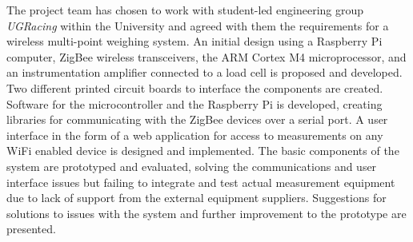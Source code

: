 The project team has chosen to work with student-led engineering group \emph{UGRacing} within the University and agreed with them the requirements for a wireless multi-point weighing system. An initial design using a Raspberry Pi computer, ZigBee wireless transceivers, the ARM Cortex M4 microprocessor, and an instrumentation amplifier connected to a load cell is proposed and developed. Two different printed circuit boards to interface the components are created. Software for the microcontroller and the Raspberry Pi is developed, creating libraries for communicating with the ZigBee devices over a serial port. A user interface in the form of a web application for access to measurements on any WiFi enabled device is designed and implemented. The basic components of the system are prototyped and evaluated, solving the communications and user interface issues but failing to integrate and test actual measurement equipment due to lack of support from the external equipment suppliers. Suggestions for solutions to issues with the system and further improvement to the prototype are presented.
